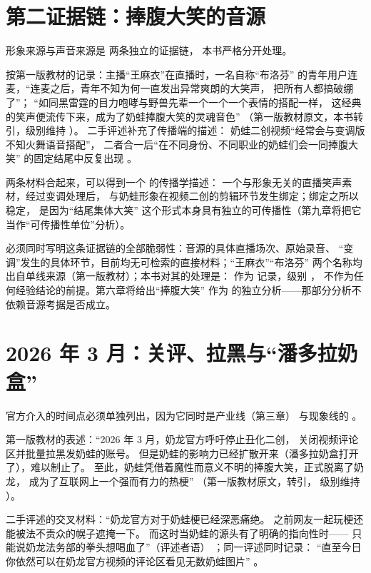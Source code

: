 \section{第二证据链：捧腹大笑的音源}\label{sec:04:audio}

形象来源与声音来源是
两条独立的证据链，
本书严格分开处理。

按第一版教材的记录：主播“王麻衣”在直播时，一名自称“布洛芬”
的青年用户连麦，“连麦之后，青年不知为何一直发出异常爽朗的大笑声，
 把所有人都搞破绷了”；
 “如同黑雷霆的目力咆哮与野兽先辈一个一个一个表情的搭配一样，
 这经典的笑声便流传下来，成为了奶蛙捧腹大笑的灵魂音色”
 （第一版教材原文，本书转引，级别维持 ）。
 二手评述补充了传播端的描述：
 奶蛙二创视频“经常会与变调版不知火舞语音搭配”，
 二者合一后“在不同身份、不同职业的奶蛙们会一同捧腹大笑”
的固定结尾中反复出现 \cite{shoutanji2026naiwa}。

两条材料合起来，可以得到一个  的传播学描述：
 一个与形象无关的直播笑声素材，经过变调处理后，
 与奶蛙形象在视频二创的剪辑环节发生绑定；绑定之所以稳定，
 是因为“结尾集体大笑”
 这个形式本身具有独立的可传播性（第九章将把它当作“可传播性单位”分析）。

必须同时写明这条证据链的全部脆弱性：音源的具体直播场次、原始录音、
 “变调”发生的具体环节，目前均无可检索的直接材料；“王麻衣”“布洛芬”
 两个名称均出自单线来源（第一版教材）；本书对其的处理是：
 作为  记录，级别 ，
 不作为任何经验结论的前提。第六章将给出“捧腹大笑”
作为 的独立分析——那部分分析不依赖音源考据是否成立。

\section{2026 年 3 月：关评、拉黑与“潘多拉奶盒”}\label{sec:04:official}

官方介入的时间点必须单独列出，因为它同时是产业线（第三章）
 与现象线的 。

第一版教材的表述：“2026 年 3 月，奶龙官方呼吁停止丑化二创，
 关闭视频评论区并批量拉黑发奶蛙的账号。
 但是奶蛙的影响力已经扩散开来（潘多拉奶盒打开了），难以制止了。
 至此，奶蛙凭借着魔性而意义不明的捧腹大笑，正式脱离了奶龙，
 成为了互联网上一个强而有力的热梗” （第一版教材原文，转引，
级别维持 ）。

二手评述的交叉材料：“奶龙官方对于奶蛙梗已经深恶痛绝。
 之前网友一起玩梗还能被法不责众的幌子遮掩一下。
 而这时当奶蛙的源头有了明确的指向性时——
 只能说奶龙法务部的拳头想喝血了”（评述者语）
 \cite{shoutanji2026naiwa}；同一评述同时记录：
 “直至今日你依然可以在奶龙官方视频的评论区看见无数奶蛙图片”
 \cite{shoutanji2026naiwa}。


